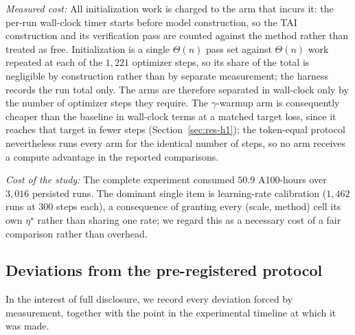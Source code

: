\documentclass[final,5p,times,twocolumn]{elsarticle}
\theoremstyle{remark}
\begin{document}
\textit{Measured cost:} All initialization work is charged to the arm that incurs
it: the per-run wall-clock timer starts before model construction, so the TAI
construction and its verification pass are counted against the method rather
than treated as free. Initialization is a single $\Theta(n)$ pass set against
$\Theta(n)$ work repeated at each of the $1{,}221$ optimizer steps, so its
share of the total is negligible by construction rather than by separate
measurement; the harness records the run total only. The arms are therefore
separated in wall-clock only by the number of optimizer steps they require. The
$\gamma$-warmup arm is consequently cheaper than the baseline in
wall-clock terms at a matched target loss, since it reaches that target in
fewer steps (Section~\ref{sec:res-h1}); the token-equal protocol nevertheless
runs every arm for the identical number of steps, so no arm receives a compute
advantage in the reported comparisons.

\textit{Cost of the study:} The complete experiment consumed $50.9$ A100-hours
over $3{,}016$ persisted runs. The dominant single item is learning-rate
calibration ($1{,}462$ runs at $300$ steps each), a consequence of granting
every (scale, method) cell its own $\eta^{\star}$ rather than sharing one rate;
we regard this as a necessary cost of a fair comparison rather than overhead.

\subsection{Deviations from the pre-registered protocol}
\label{sec:deviations}

In the interest of full disclosure, we record every deviation forced by
measurement, together with the point in the experimental timeline at which it
was made.
\end{document}
